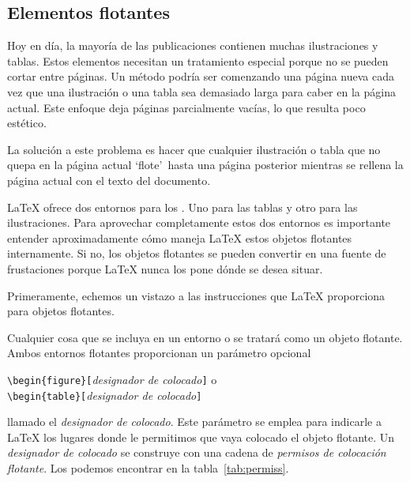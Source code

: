 \subsection{Elementos flotantes}

Hoy  en  día,  la  mayoría   de  las  publicaciones  contienen  muchas
ilustraciones  y  tablas.  Estos elementos  necesitan  un  tratamiento
especial porque  no se pueden  cortar entre páginas. Un  método podría
ser comenzando  una página nueva  cada vez  que una ilustración  o una
tabla sea demasiado larga para caber en la página actual. Este enfoque
deja páginas parcialmente vacías, lo que resulta poco estético.

La solución a este problema es hacer que cualquier ilustración o tabla
que no quepa  en la página actual `flote'\ hasta  una página posterior
mientras se rellena la página actual con el texto del documento.

\LaTeX{}  ofrece  dos  entornos  para  los  .
Uno   para  las   tablas   y  otro   para   las  ilustraciones.   Para
aprovechar  completamente estos  dos entornos  es importante  entender
aproximadamente   cómo  maneja   \LaTeX{}   estos  objetos   flotantes
internamente. Si no, los objetos  flotantes se pueden convertir en una
fuente de frustaciones  porque \LaTeX{} nunca los pone  dónde se desea
situar.


Primeramente,  echemos un  vistazo  a las  instrucciones que  \LaTeX{}
proporciona para objetos flotantes.

Cualquier cosa que  se incluya en un entorno   o 
se  tratará   como  un  objeto  flotante.   Ambos  entornos  flotantes
proporcionan un parámetro opcional

\begin{command}
\verb|\begin{figure}[|\emph{designador de colocado}\verb|]| o\\
\verb|\begin{table}[|\emph{designador de colocado}\verb|]|
\end{command}

\noindent llamado el \emph{designador  de colocado}. Este parámetro se
emplea para indicarle  a \LaTeX{} los lugares donde  le permitimos que
vaya colocado el objeto flotante.  Un \emph{designador de colocado} se
construye con  una cadena  de \emph{permisos de  colocación flotante}.
Los podemos encontrar en la tabla~\ref{tab:permiss}.

